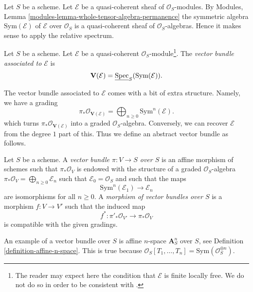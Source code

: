 \noindent
Let $S$ be a scheme.
Let $\mathcal{E}$ be a quasi-coherent sheaf of $\mathcal{O}_S$-modules.
By Modules, Lemma \ref{modules-lemma-whole-tensor-algebra-permanence}
the symmetric algebra $\text{Sym}(\mathcal{E})$ of
$\mathcal{E}$ over $\mathcal{O}_S$
is a quasi-coherent sheaf of $\mathcal{O}_S$-algebras.
Hence it makes sense to apply the relative spectrum.

\begin{definition}
\label{definition-vector-bundle}
Let $S$ be a scheme. Let $\mathcal{E}$ be a quasi-coherent
$\mathcal{O}_S$-module\footnote{The reader may expect here
the condition that $\mathcal{E}$ is finite locally free. We do not
do so in order to be consistent with \cite[II, Definition 1.7.8]{EGA}.}.
The {\it vector bundle associated to $\mathcal{E}$} is
$$
\mathbf{V}(\mathcal{E}) = \underline{\mathop{\mathrm{Spec}}}_S(\text{Sym}(\mathcal{E})).
$$
\end{definition}

\noindent
The vector bundle associated to $\mathcal{E}$ comes with a bit
of extra structure. Namely, we have a grading
$$
\pi_*\mathcal{O}_{\mathbf{V}(\mathcal{E})} =
\bigoplus\nolimits_{n \geq 0} \text{Sym}^n(\mathcal{E}).
$$
which turns $\pi_*\mathcal{O}_{\mathbf{V}(\mathcal{E})}$
into a graded $\mathcal{O}_S$-algebra. Conversely, we can recover
$\mathcal{E}$ from the degree $1$ part of this.
Thus we define an abstract vector bundle as follows.

\begin{definition}
\label{definition-abstract-vector-bundle}
Let $S$ be a scheme. A {\it vector bundle $\pi : V \to S$ over $S$} is an
affine morphism of schemes such that $\pi_*\mathcal{O}_V$ is endowed with
the structure of a graded $\mathcal{O}_S$-algebra
$\pi_*\mathcal{O}_V = \bigoplus\nolimits_{n \geq 0} \mathcal{E}_n$
such that $\mathcal{E}_0 = \mathcal{O}_S$ and such that the maps
$$
\text{Sym}^n(\mathcal{E}_1) \longrightarrow \mathcal{E}_n
$$
are isomorphisms for all $n \geq 0$. A {\it morphism of vector bundles
over $S$} is a morphism $f : V \to V'$ such that the induced map
$$
f^* : \pi'_*\mathcal{O}_{V'} \longrightarrow \pi_*\mathcal{O}_V
$$
is compatible with the given gradings.
\end{definition}

\noindent
An example of a vector bundle over $S$ is affine $n$-space
$\mathbf{A}^n_S$ over $S$, see Definition \ref{definition-affine-n-space}.
This is true because
$\mathcal{O}_S[T_1, \ldots, T_n] = \text{Sym}(\mathcal{O}_S^{\oplus n})$.

